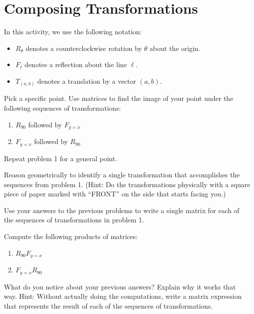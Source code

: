 \newpage
\section{Composing Transformations}

In this activity, we use the following notation:  
\begin{itemize}
\item $R_\theta$ denotes a counterclockwise rotation by $\theta$ about the origin.
\item $F_\ell$ denotes a reflection about the line $\ell$.  
\item $T_{(a,b)}$ denotes a translation by a vector $(a,b)$.  
\end{itemize}


\begin{prob}   Pick a specific point.  Use matrices to find the image of your point under the following sequences of transformations: 
\begin{enumerate}
\item $R_{90}$ followed by $F_{y=x}$
\item $F_{y=x}$  followed by $R_{90}$ 
\end{enumerate}
\end{prob}

\begin{prob} Repeat problem 1 for a general point.  
\end{prob}

\begin{prob}
Reason geometrically to identify a single transformation that accomplishes the sequences from problem 1.  (Hint:  Do the transformations physically with a square piece of paper marked with ``FRONT'' on the side that starts facing you.)
\end{prob}

\begin{prob}
Use your answers to the previous problems to write a single matrix for each of the sequences of transformations in problem 1.  
\end{prob}

\begin{prob}
Compute the following products of matrices:  
\begin{enumerate}
\item $R_{90} F_{y=x}$
\item $F_{y=x} R_{90}$ 
\end{enumerate}
\end{prob}

\begin{prob} What do you notice about your previous answers?  Explain why it works that way.  Hint: Without actually doing the computations, write a matrix expression that represents the result of each of the sequences of transformations.  
\end{prob}
